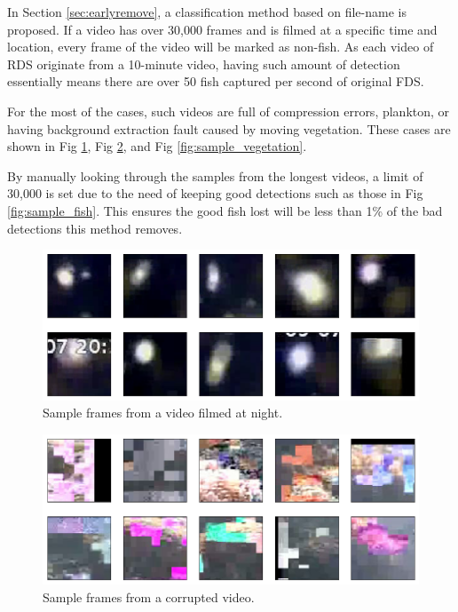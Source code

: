 \documentclass[bsc,logo,twoside,fullspacing,parskip]{infthesis}
\begin{document}
\begin{appendices}
In Section \ref{sec:earlyremove}, a classification method based on file-name is proposed.
If a video has over 30,000 frames and is filmed at a specific time and location, every frame of the video will be marked as non-fish. 
As each video of RDS originate from a 10-minute video, having such amount of detection essentially means there are over 50 fish captured per second of original FDS.

For the most of the cases, such videos are full of compression errors, plankton, or having background extraction fault caused by moving vegetation. These cases are shown in Fig \ref{fig:sample_night}, Fig \ref{fig:sample_corrupt}, and Fig \ref{fig:sample_vegetation}.

By manually looking through the samples from the longest videos, a limit of 30,000 is set due to the need of keeping good detections such as those in Fig \ref{fig:sample_fish}. This ensures the good fish lost will be less than 1\% of the bad detections this method removes.

\begin{figure}
\centering
    \includegraphics[scale=0.46]{graph/sample_night.png}
    \caption{Sample frames from a video filmed at night.}
    \label{fig:sample_night}
\end{figure}

\begin{figure}
\centering
    \includegraphics[scale=0.46]{graph/sample_corrupt.png}
    \caption{Sample frames from a corrupted video.}
    \label{fig:sample_corrupt}
\end{figure}


\end{appendices}
\end{document}
